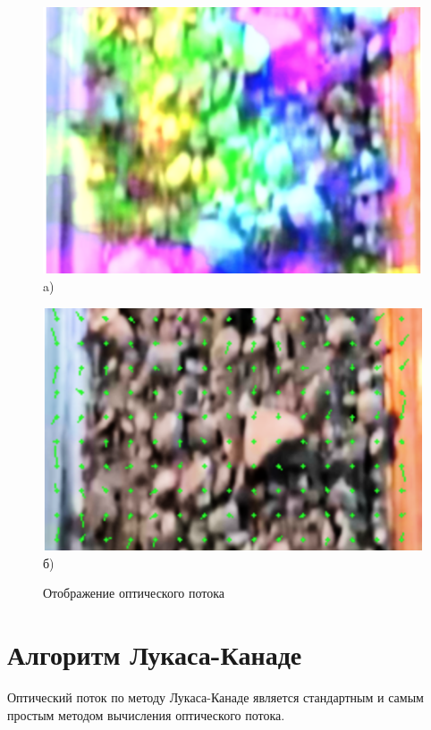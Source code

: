 \documentclass[times]{itmo-student-thesis}
\begin{document}
\begin{figure}[h]
	\begin{minipage}[h]{0.49\linewidth}
		\centering
		\includegraphics[width=0.9\linewidth]{images/color} \\ a)
	\end{minipage}
	\hfill
	\begin{minipage}[h]{0.49\linewidth}
		\centering
		\includegraphics[width=0.9\linewidth]{images/vector} \\ б)
	\end{minipage}
	\caption{Отображение оптического потока}
	\label{fig:flow}
\end{figure}


\section{Алгоритм Лукаса-Канаде}

Оптический поток по методу Лукаса-Канаде является стандартным и самым простым методом вычисления оптического потока.
\end{document}
